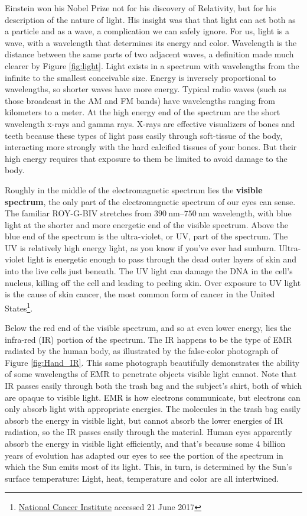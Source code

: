 \documentclass[amstex,12pt]{book}
\begin{document}
Einstein won his Nobel Prize not for his discovery of Relativity, but for his description of the nature of light. His insight was that that light can act both as a particle and as a wave, a complication we can safely ignore. For us, light is a wave, with a wavelength that determines its energy and color. Wavelength is the distance between the same parts of two adjacent waves, a definition made much clearer by Figure \ref{fig:light}. Light exists in a spectrum with wavelengths from the infinite to the smallest conceivable size. Energy is inversely proportional to wavelengths, so shorter waves have more energy. Typical radio waves (such as those broadcast in the AM and FM bands) have wavelengths ranging from kilometers to a meter. At the high energy end of the spectrum are the short wavelength x-rays and gamma rays. X-rays are effective visualizers of bones and teeth because these types of light pass easily through soft-tissue of the body, interacting more strongly with the hard calcified tissues of your bones. But their high energy requires that exposure to them be limited to avoid damage to the body.

Roughly in the middle of the electromagnetic spectrum lies the \textbf{visible spectrum}, the only part of the electromagnetic spectrum of our eyes can sense. The familiar ROY-G-BIV stretches from $\SIrange{390 }{ 750}{\nano\metre}$ wavelength, with blue light at the shorter and more energetic end of the visible spectrum. Above the blue end of the spectrum is the ultra-violet, or UV, part of the spectrum. The UV is relatively high energy light, as you know if you've ever had sunburn. Ultra-violet light is energetic enough to pass through the dead outer layers of skin and into the live cells just beneath. The UV light can damage the DNA in the cell's nucleus, killing off the cell and leading to peeling skin. Over exposure to UV light is the cause of skin cancer, the most common form of cancer in the United States\footnote{\href{https://www.cancer.gov/types/skin}{National Cancer Institute} accessed 21 June 2017}.
 
Below the red end of the visible spectrum, and so at even lower energy, lies the infra-red (IR) portion of the spectrum. The IR happens to be the type of EMR radiated by the human body, as illustrated by the false-color photograph of Figure \ref{fig:Hand_IR}. This same photograph beautifully demonstrates the ability of some wavelengths of EMR to penetrate objects visible light cannot. Note that IR passes easily through both the trash bag and the subject's shirt, both of which are opaque to visible light. EMR is how electrons communicate, but electrons can only absorb light with appropriate energies. The molecules in the trash bag easily absorb the energy in visible light, but cannot absorb the lower energies of IR radiation, so the IR passes easily through the material. Human eyes apparently absorb the energy in visible light efficiently, and that's because some 4 billion years of evolution has adapted our eyes to see the portion of the spectrum in which the Sun emits most of its light. This, in turn, is determined by the Sun's surface temperature: Light, heat, temperature and color are all intertwined.
\end{document}

